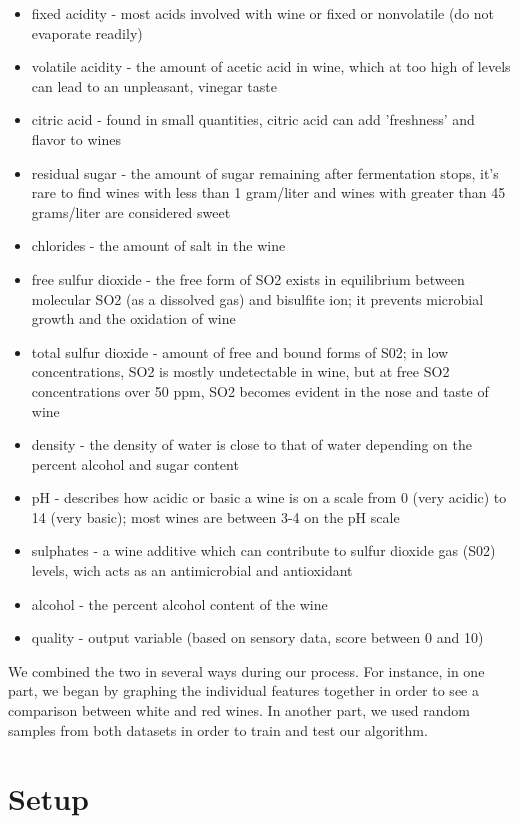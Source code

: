 \documentclass[11pt]{article}
\begin{document}
\begin{itemize}
\item
  fixed acidity - most acids involved with wine or fixed or nonvolatile
  (do not evaporate readily)
\item
  volatile acidity - the amount of acetic acid in wine, which at too
  high of levels can lead to an unpleasant, vinegar taste
\item
  citric acid - found in small quantities, citric acid can add
  'freshness' and flavor to wines
\item
  residual sugar - the amount of sugar remaining after fermentation
  stops, it's rare to find wines with less than 1 gram/liter and wines
  with greater than 45 grams/liter are considered sweet
\item
  chlorides - the amount of salt in the wine
\item
  free sulfur dioxide - the free form of SO2 exists in equilibrium
  between molecular SO2 (as a dissolved gas) and bisulfite ion; it
  prevents microbial growth and the oxidation of wine
\item
  total sulfur dioxide - amount of free and bound forms of S02; in low
  concentrations, SO2 is mostly undetectable in wine, but at free SO2
  concentrations over 50 ppm, SO2 becomes evident in the nose and taste
  of wine
\item
  density - the density of water is close to that of water depending on
  the percent alcohol and sugar content
\item
  pH - describes how acidic or basic a wine is on a scale from 0 (very
  acidic) to 14 (very basic); most wines are between 3-4 on the pH scale
\item
  sulphates - a wine additive which can contribute to sulfur dioxide gas
  (S02) levels, wich acts as an antimicrobial and antioxidant
\item
  alcohol - the percent alcohol content of the wine
\item
  quality - output variable (based on sensory data, score between 0 and
  10)
\end{itemize}

We combined the two in several ways during our process. For instance, in
one part, we began by graphing the individual features together in order
to see a comparison between white and red wines. In another part, we
used random samples from both datasets in order to train and test our
algorithm.

    \section{Setup}\label{setup}
\end{document}
